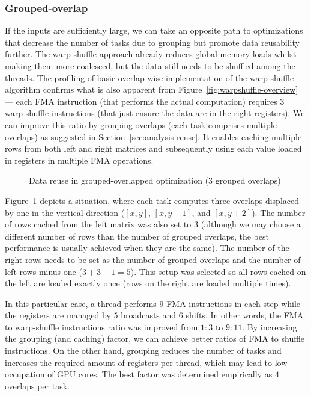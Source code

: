 \subsubsection{Grouped-overlap}\label{sec:grouped-overlap-alg}

If the inputs are sufficiently large, we can take an opposite path to optimizations that decrease the number of tasks due to grouping but promote data reusability further. The warp-shuffle approach already reduces global memory loads whilst making them more coalesced, but the data still needs to be shuffled among the threads. The profiling of basic overlap-wise implementation of the warp-shuffle algorithm confirms what is also apparent from Figure~\ref{fig:warpshuffle-overview} --- each FMA instruction (that performs the actual computation) requires $3$ warp-shuffle instructions (that just ensure the data are in the right registers). We can improve this ratio by grouping overlaps (each task comprises multiple overlaps) as suggested in Section~\ref{sec:analysis-reuse}. It enables caching multiple rows from both left and right matrices and subsequently using each value loaded in registers in multiple FMA operations.

\begin{figure}[ht]
	\centering
	\def\svgwidth{0.8\textwidth}
	\fontsize{9}{12}\selectfont
	
	\caption{Data reuse in grouped-overlapped optimization (3 grouped overlaps)}
	\label{fig:warpshuffle-grouped}
\end{figure}

Figure~\ref{fig:warpshuffle-grouped} depicts a situation, where each task computes three overlaps displaced by one in the vertical direction ($[x,y]$, $[x,y+1]$, and $[x,y+2]$). The number of rows cached from the left matrix was also set to $3$ (although we may choose a different number of rows than the number of grouped overlaps, the best performance is usually achieved when they are the same). The number of the right rows needs to be set as the number of grouped overlaps and the number of left rows minus one ($3+3-1 = 5$). This setup was selected so all rows cached on the left are loaded exactly once (rows on the right are loaded multiple times).

In this particular case, a thread performs $9$ FMA instructions in each step while the registers are managed by $5$ broadcasts and $6$ shifts. In other words, the FMA to warp-shuffle instructions ratio was improved from $1:3$ to $9:11$. By increasing the grouping (and caching) factor, we can achieve better ratios of FMA to shuffle instructions. On the other hand, grouping reduces the number of tasks and increases the required amount of registers per thread, which may lead to low occupation of GPU cores. The best factor was determined empirically as $4$ overlaps per task.


